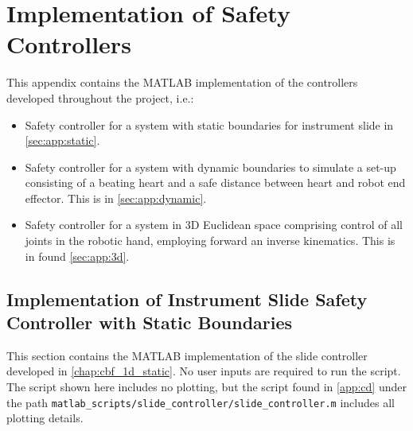\section{Implementation of Safety Controllers}
This appendix contains the MATLAB implementation of the controllers developed throughout the project, i.e.:
\begin{itemize}
\item Safety controller for a system with static boundaries for instrument slide in \autoref{sec:app:static}.
\item Safety controller for a system with dynamic boundaries to simulate a set-up consisting of a beating heart and a safe distance between heart and robot end effector. This is in \autoref{sec:app:dynamic}.
\item Safety controller for a system in 3D Euclidean space comprising control of all joints in the robotic hand, employing forward an inverse kinematics. This is in found \autoref{sec:app:3d}.
\end{itemize}
\subsection{Implementation of Instrument Slide Safety Controller with Static Boundaries}\label{sec:app:static}
This section contains the MATLAB implementation of the slide controller developed in \autoref{chap:cbf_1d_static}. No user inputs are required to run the script. The script shown here includes no plotting, but the script found in \autoref{app:cd} under the path \texttt{matlab\_scripts/slide\_controller/slide\_controller.m} includes all plotting details.\\

